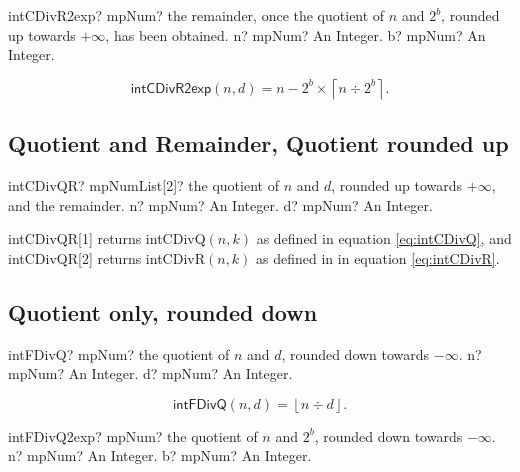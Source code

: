 \vspace{0.3cm}
\begin{mpFunctionsExtract}
	\mpFunctionTwo
	{intCDivR2exp? mpNum? the remainder, once the quotient of $n$ and $2^b$, rounded up towards $+\infty$, has been obtained.}
	{n? mpNum? An Integer.}
	{b? mpNum? An Integer.}
\end{mpFunctionsExtract}

\begin{equation}
	\label{eq:intCDivR2exp}
	\textsf{intCDivR2exp}(n, d) =n - 2^b \times \left\lceil n \div 2^b\right\rceil.
\end{equation}





\subsection{Quotient and Remainder,  Quotient rounded up}

\begin{mpFunctionsExtract}
	\mpFunctionTwo
	{intCDivQR? mpNumList[2]? the quotient of $n$ and $d$, rounded up towards $+\infty$, and the remainder.}
	{n? mpNum? An Integer.}
	{d? mpNum? An Integer.}
\end{mpFunctionsExtract}

\vspace{0.3cm}
\textsf{intCDivQR}[1] returns \textsf{intCDivQ$(n, k)$} as defined in equation \ref{eq:intCDivQ}, and \textsf{intCDivQR}[2] returns \textsf{intCDivR$(n, k)$} as defined in in equation \ref{eq:intCDivR}.





\subsection{Quotient only, rounded down}

\begin{mpFunctionsExtract}
	\mpFunctionTwo
	{intFDivQ? mpNum? the quotient of $n$ and $d$, rounded down towards $-\infty$.}
	{n? mpNum? An Integer.}
	{d? mpNum? An Integer.}
\end{mpFunctionsExtract}

\begin{equation}
	\label{eq:intFDivQ}
	\textsf{intFDivQ}(n, d) =\left\lfloor n \div d\right\rfloor.
\end{equation}

\vspace{0.3cm}
\begin{mpFunctionsExtract}
	\mpFunctionTwo
	{intFDivQ2exp? mpNum? the quotient of $n$ and $2^b$, rounded down towards $-\infty$.}
	{n? mpNum? An Integer.}
	{b? mpNum? An Integer.}
\end{mpFunctionsExtract}


